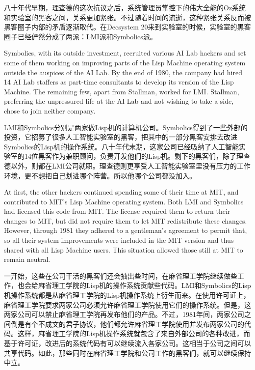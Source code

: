 \ifdefined\chs
八十年代早期，理查德的这次抗议之后，系统管理员掌控下的伟大全能的Oz系统和实验室的黑客之间，关系更加紧张。不过随着时间的流逝，这种紧张关系反而被黑客圈子内部的矛盾逐渐取代。在Decsystem 20来到实验室的时候，实验室的黑客圈子已经俨然分成了两派：LMI派和Symbolics派。
\fi

\ifdefined\eng
Symbolics, with its outside investment, recruited various AI Lab hackers and set some of them working on improving parts of the Lisp Machine operating system outside the auspices of the AI Lab. By the end of 1980, the company had hired 14 AI Lab staffers as part-time consultants to develop its version of the Lisp Machine. The remaining few, apart from Stallman, worked for LMI.  Stallman, preferring the unpressured life at the AI Lab and not wishing to take a side, chose to join neither company.
\fi

\ifdefined\chs
LMI和Symbolics分别是两家做Lisp机的计算机公司。Symbolics得到了一些外部的投资，它招募了很多人工智能实验室的黑客，把其中的一部分黑客安排去改进Symbolics的Lisp机的操作系统。八十年代末期，这家公司已经吸纳了人工智能实验室的14位黑客作为兼职顾问，负责开发他们的Lisp机。剩下的黑客们，除了理查德以外，则都在LMI公司就职。理查德则更享受人工智能实验室里没有压力的工作环境，更不想把自己划进哪个阵营。所以他哪个公司都没加入。
\fi

\ifdefined\eng
At first, the other hackers continued spending some of their time at MIT, and contributed to MIT's Lisp Machine operating system. Both LMI and Symbolics had licensed this code from MIT. The license required them to return their changes to MIT, but did not require them to let MIT redistribute these changes.  However, through 1981 they adhered to a gentleman's agreement to permit that, so all their system improvements were included in the MIT version and thus shared with all Lisp Machine users. This situation allowed those still at MIT to remain neutral.
\fi

\ifdefined\chs
一开始，这些在公司干活的黑客们还会抽出些时间，在麻省理工学院继续做些工作，也会给麻省理工学院的Lisp机的操作系统贡献些代码。LMI和Symbolics的Lisp机操作系统都是从麻省理工学院的Lisp机操作系统上衍生而来。在使用许可证上，麻省理工学院要求两家公司必须允许麻省理工学院使用它们的操作系统。但是，这两家公司可以禁止麻省理工学院再发布他们的产品。不过，1981年间，两家公司之间倒是有个不成文的君子协议，他们都允许麻省理工学院使用并发布两家公司的代码。这样，麻省理工学院的Lisp机操作系统就包含了来自外部公司的各种改进，而基于许可证，改进后的系统代码有可以继续流入各家公司。这相当于公司之间可以共享代码。如此，那些同时在麻省理工学院和公司工作的黑客们，就可以继续保持中立。
\fi

